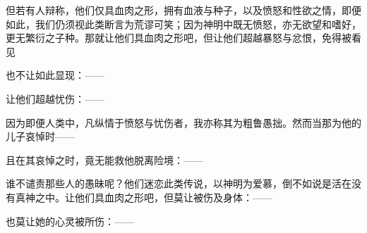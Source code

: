 但若有人辩称，他们仅具血肉之形，拥有血液与种子，以及愤怒和性欲之情，即便如此，我们仍须视此类断言为荒谬可笑；因为神明中既无愤怒，亦无欲望和嗜好，更无繁衍之子种。那就让他们具血肉之形吧，但让他们超越暴怒与忿恨，免得被看见\par

\par

也不让如此显现：——\par

\par

让他们超越忧伤：——\par

\par

因为即便人类中，凡纵情于愤怒与忧伤者，我亦称其为粗鲁愚拙。然而当那为他的儿子哀悼时——\par

\par

且在其哀悼之时，竟无能救他脱离险境：——\par

\par

谁不谴责那些人的愚昧呢？他们迷恋此类传说，以神明为爱慕，倒不如说是活在没有真神之中。让他们具血肉之形吧，但莫让被伤及身体：——\par

\par

也莫让她的心灵被所伤：——\par

\newline{}\par

